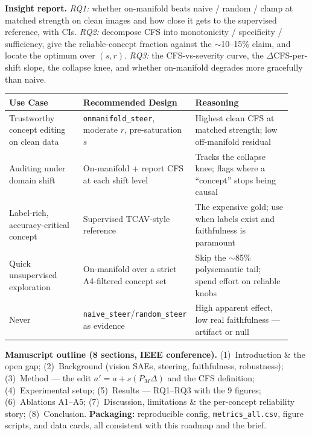 \documentclass[11pt]{article}
\begin{document}
\textbf{Insight report.} \emph{RQ1:} whether on-manifold beats naive / random / clamp at
matched strength on clean images and how close it gets to the supervised reference, with
CIs. \emph{RQ2:} decompose CFS into monotonicity / specificity / sufficiency, give the
reliable-concept fraction against the $\sim$10--15\% claim, and locate the optimum over
$(s,r)$. \emph{RQ3:} the CFS-vs-severity curve, the $\Delta$CFS-per-shift slope, the
collapse knee, and whether on-manifold degrades more gracefully than naive.

\renewcommand{\arraystretch}{1.2}
\begin{center}\small
\begin{tabular}{@{}p{0.27\linewidth} p{0.30\linewidth} p{0.36\linewidth}@{}}
\toprule
\textbf{Use Case} & \textbf{Recommended Design} & \textbf{Reasoning}\\
\midrule
Trustworthy concept editing on clean data & \texttt{onmanifold\_steer}, moderate $r$,
  pre-saturation $s$ & Highest clean CFS at matched strength; low off-manifold residual\\
Auditing under domain shift & On-manifold + report CFS at each shift level & Tracks the
  collapse knee; flags where a ``concept'' stops being causal\\
Label-rich, accuracy-critical concept & Supervised TCAV-style reference & The expensive
  gold; use when labels exist and faithfulness is paramount\\
Quick unsupervised exploration & On-manifold over a strict A4-filtered concept set & Skip
  the $\sim$85\% polysemantic tail; spend effort on reliable knobs\\
Never & \texttt{naive\_steer}/\texttt{random\_steer} as evidence & High apparent effect,
  low real faithfulness --- artifact or null\\
\bottomrule
\end{tabular}
\end{center}

\textbf{Manuscript outline (8 sections, IEEE conference).}
(1)~Introduction \& the open gap; (2)~Background (vision SAEs, steering, faithfulness,
robustness); (3)~Method --- the edit $a'=a+s(P_M\Delta)$ and the CFS definition;
(4)~Experimental setup; (5)~Results --- RQ1--RQ3 with the 9 figures; (6)~Ablations
A1--A5; (7)~Discussion, limitations \& the per-concept reliability story;
(8)~Conclusion. \textbf{Packaging:} reproducible config, \texttt{metrics\_all.csv},
figure scripts, and data cards, all consistent with this roadmap and the brief.
\end{document}
